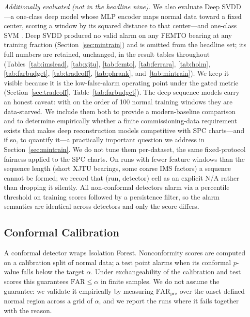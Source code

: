\documentclass[IJPHM, 2026, 0]{PHMSociety}
\begin{document}
\emph{Additionally evaluated (not in the headline nine).} We also evaluate Deep SVDD \cite{ruff2018deep}---a one-class deep model whose MLP encoder maps normal data toward a fixed center, scoring a window by its squared distance to that center---and one-class SVM \cite{scholkopf2001estimating}. Deep SVDD produced no valid alarm on any FEMTO bearing at any training fraction (Section~\ref{sec:mintrain}) and is omitted from the headline set; its full numbers are retained, unchanged, in the result tables throughout (Tables~\ref{tab:imslead}, \ref{tab:xjtu}, \ref{tab:femto}, \ref{tab:ferrara}, \ref{tab:holm}, \ref{tab:farbudget}, \ref{tab:tradeoff}, \ref{tab:phrank}, and~\ref{tab:mintrain}). We keep it visible because it is the low-false-alarm operating point under the gated metric (Section~\ref{sec:tradeoff}, Table~\ref{tab:farbudget}). The deep sequence models carry an honest caveat: with on the order of 100 normal training windows they are data-starved. We include them both to provide a modern-baseline comparison and to determine empirically whether a finite commissioning-data requirement exists that makes deep reconstruction models competitive with SPC charts---and if so, to quantify it---a practically important question we address in Section~\ref{sec:mintrain}. We do not tune them per-dataset, the same fixed-protocol fairness applied to the SPC charts. On runs with fewer feature windows than the sequence length (short XJTU bearings, some coarse IMS factors) a sequence cannot be formed; we record that (run, detector) cell as an explicit N/A rather than dropping it silently. All non-conformal detectors alarm via a percentile threshold on training scores followed by a persistence filter, so the alarm semantics are identical across detectors and only the score differs.

\subsection{Conformal Calibration}
A conformal detector \cite{vovk2005algorithmic} wraps Isolation Forest. Nonconformity scores are computed on a calibration split of normal data; a test point alarms when its conformal $p$-value falls below the target $\alpha$. Under exchangeability of the calibration and test scores this guarantees $\text{FAR} \le \alpha$ in finite samples. We do not assume the guarantee: we validate it empirically by measuring $\text{FAR}_{\text{pre}}$ over the onset-defined normal region across a grid of $\alpha$, and we report the runs where it fails together with the reason.
\end{document}
